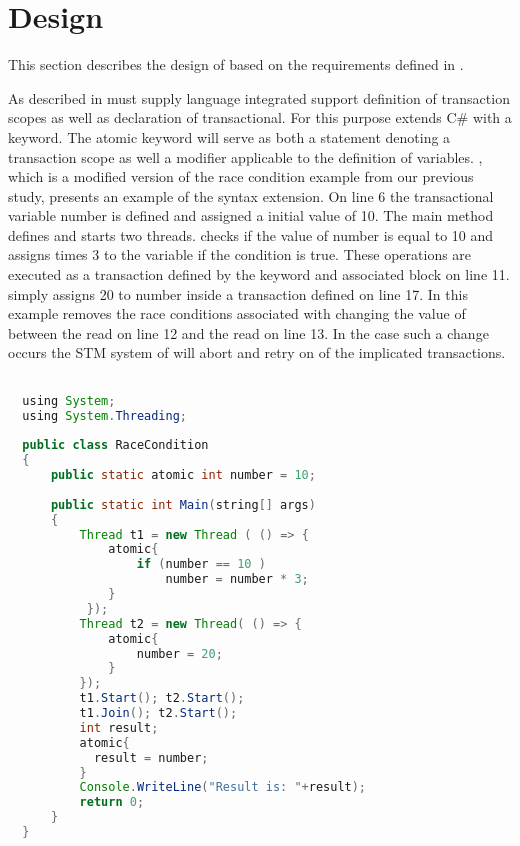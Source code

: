 

\section{Design}
\label{sec:stm_design}
This section describes the design of \stmnamesp based on the requirements defined in .

As described in  \stmnamesp must supply language integrated support definition of transaction scopes as well as declaration of transactional. For this purpose \stmnamesp extends C\# with a  keyword. The atomic keyword will serve as both a statement denoting a transaction scope as well a modifier applicable to the definition of variables. , which is a modified version of the race condition example from our previous study\cite[p. 23]{dpt907e14trending}, presents an example of the syntax extension. On line 6 the transactional variable number is defined and assigned a initial value of 10. The main method defines and starts two threads.  checks if the value of number is equal to 10 and assigns  times 3 to the variable if the condition is true. These operations are executed as a transaction defined by the  keyword and associated block on line 11.  simply assigns 20 to number inside a transaction defined on line 17. In this example \stmnamesp removes the race conditions associated with  changing the value of  between the read on line 12 and the read on line 13. In the case such a change occurs the \ac{STM} system of \stmnamesp will abort and retry on of the implicated transactions.
 
\begin{lstlisting}[label=lst:stm_atomic_syntax,
  caption={Transaction Syntax},
  language=Java,  
  showspaces=false,
  showtabs=false,
  breaklines=true,
  showstringspaces=false,
  breakatwhitespace=true,
  commentstyle=\color{greencomments},
  keywordstyle=\color{bluekeywords},
  stringstyle=\color{redstrings},
  morekeywords={atomic, retry, orElse, var, get, set, using}]  % Start your code-block

  using System;
  using System.Threading;
  
  public class RaceCondition
  {
      public static atomic int number = 10;
  
      public static int Main(string[] args)
      {
          Thread t1 = new Thread ( () => {
              atomic{
                  if (number == 10 )           
                      number = number * 3;
              }
           });
          Thread t2 = new Thread( () => {
              atomic{
                  number = 20;
              }
          });
          t1.Start(); t2.Start();
          t1.Join(); t2.Start();
          int result;
          atomic{
          	result = number;          
          }
          Console.WriteLine("Result is: "+result);
          return 0;
      }
  }
\end{lstlisting}

